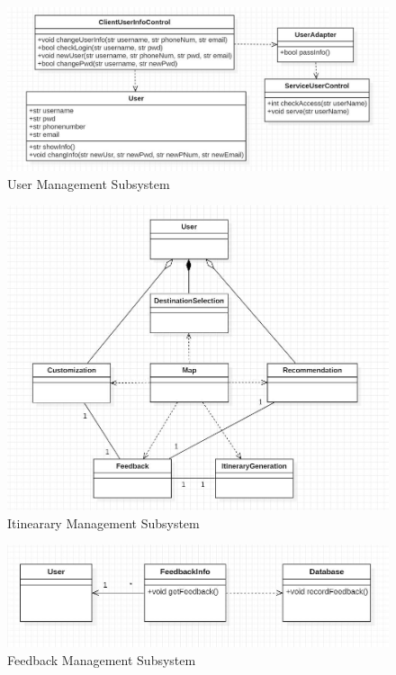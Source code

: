 \documentclass[10pt]{article}
\begin{document}
\begin{figure}[H]
    \centering
    
    \includegraphics[width=14cm]{usermanager.jpg}
    \caption{User Management Subsystem}
    \label{User Management Subsystem}
\end{figure}

\begin{figure}[H]
    \centering
    
    \includegraphics[width=14cm]{journeymanager.jpg}
    \caption{Itinearary Management Subsystem}
    \label{Itinearary Management Subsystem}
\end{figure}

\begin{figure}[H]
    \centering
    
    \includegraphics[width=14cm]{reportmanager.jpg}
    \caption{Feedback Management Subsystem}
    \label{Feedback Management Subsystem}
\end{figure}
\end{document}
